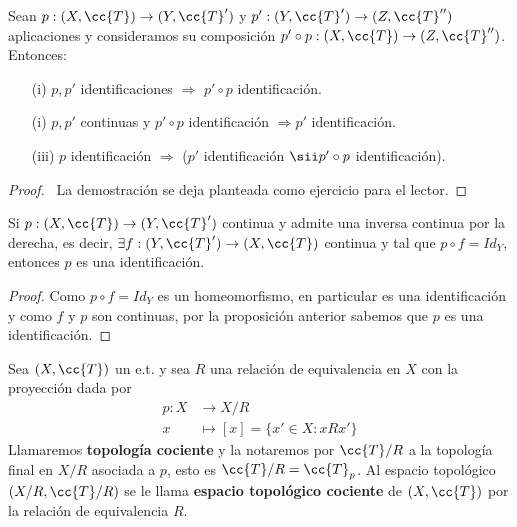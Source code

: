 \begin{prop}
    Sean $p:(X, \cc{T}) \to (Y, \cc{T}')$ y $p':(Y, \cc{T}') \to (Z, \cc{T}'')$ aplicaciones y consideramos su composición $p'\circ p:(X, \cc{T})\to (Z, \cc{T}'')$. Entonces:
    \begin{enumerate}
        \item[(i)] $p,p'$ identificaciones $\Rightarrow$ $p'\circ p$ identificación.
        \item[(i)] $p,p'$ continuas y $p'\circ p$ identificación $\Rightarrow p'$ identificación.
        \item[(iii)] $p$ identificación $\Rightarrow$ ($p'$ identificación $ \sii p'\circ p$ identificación). 
    \end{enumerate}
    \begin{proof}\ 
        La demostración se deja planteada como ejercicio para el lector.

    \end{proof}
\end{prop}

\begin{coro}
    Si $p:(X, \cc{T})\to (Y, \cc{T}')$ continua y admite una inversa continua por la derecha, es decir, $\exists f:(Y, \cc{T}')\to (X, \cc{T})$ continua y tal que $p\circ f=Id_Y$, entonces $p$ es una identificación.
    \begin{proof}
        Como $p\circ f=Id_Y$ es un homeomorfismo, en particular es una identificación y como $f$ y $p$ son continuas, por la proposición anterior sabemos que $p$ es una identificación. 

    \end{proof}
\end{coro}

\begin{definicion}
    Sea $(X, \cc{T})$ un e.t. y sea $R$ una relación de equivalencia en $X$ con la proyección dada por
    \begin{align*}
        p:X&\to X/R\\
        x &\mapsto [x] = \{x'\in X : xRx'\}
    \end{align*}
    Llamaremos \textbf{topología cociente} y la notaremos por $\cc{T}/R$ a la topología final en $X/R$ asociada a $p$, esto es $\cc{T}/R=\cc{T}_p$. Al espacio topológico $(X/R, \cc{T}/R)$ se le llama \textbf{espacio topológico cociente} de $(X, \cc{T})$ por la relación de equivalencia $R$.
    \endsquare
\end{definicion}


